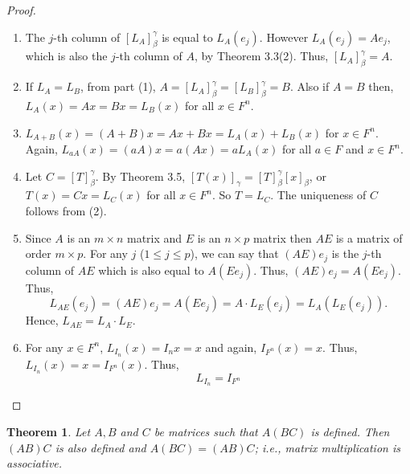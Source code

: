 \documentclass[12pt, a4paper]{article}
\newtheorem{theorem}{Theorem}[section]
\theoremstyle{definition}
\theoremstyle{remark}
\begin{document}
\begin{proof}
    \begin{enumerate}
        \item The $j$-th column of $[L_A]_\beta^\gamma$ is equal to $L_A(e_j)$. However $L_A(e_j) = Ae_j$, which is also the $j$-th column of $A$, by Theorem 3.3(2). Thus, $[L_A]_\beta^\gamma = A$.

        \item If $L_A = L_B$, from part (1), $A = [L_A]_\beta^\gamma = [L_B]_\beta^\gamma = B$. Also if $A = B$ then, $L_A(x) = Ax = Bx = L_B(x)$ for all $x \in F^n$.

        \item $L_{A+B}(x) = (A+B)x = Ax + Bx = L_A(x) + L_B(x)$ for $x \in F^n$. \\
        Again, $L_{aA}(x) = (aA)x = a(Ax) = aL_A(x)$ for all $a \in F$ and $x \in F^n$.

        \item Let $C = [T]_\beta^\gamma$. By Theorem 3.5, $[T(x)]_\gamma = [T]_\beta^\gamma [x]_\beta$, or $T(x) = Cx = L_C(x)$ for all $x \in F^n$. So $T = L_C$. The uniqueness of $C$ follows from (2).

        \item Since $A$ is an $m \times n$ matrix and $E$ is an $n \times p$ matrix then $AE$ is a matrix of order $m \times p$. For any $j$ ($1 \le j \le p$), we can say that $(AE)e_j$ is the $j$-th column of $AE$ which is also equal to $A(Ee_j)$. Thus, $(AE)e_j = A(Ee_j)$. Thus,
        \[ L_{AE}(e_j) = (AE)e_j = A(Ee_j) = A \cdot L_E(e_j) = L_A(L_E(e_j)). \]
        Hence, $L_{AE} = L_A \cdot L_E$.

        \item For any $x \in F^n$, $L_{I_n}(x) = I_n x = x$ and again, $I_{F^n}(x) = x$. Thus, $L_{I_n}(x) = x = I_{F^n}(x)$. Thus,
        \[ L_{I_n} = I_{F^n} \]
    \end{enumerate}
\end{proof}

\begin{theorem}
    Let $A, B$ and $C$ be matrices such that $A(BC)$ is defined. Then $(AB)C$ is also defined and $A(BC) = (AB)C$; i.e., matrix multiplication is associative.
\end{theorem}
\end{document}
